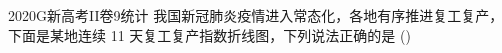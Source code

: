
\begin{problem}{2020}{G}{新高考II卷}{9}{统计}
我国新冠肺炎疫情进入常态化，各地有序推进复工复产，下面是某地连续 11 天复工复产指数折线图，下列说法正确的是 (\hspace{1cm})
\begin{choices}
\end{choices}
\end{problem}

\begin{answer}

\end{answer}

\begin{solutions}

\end{solutions}